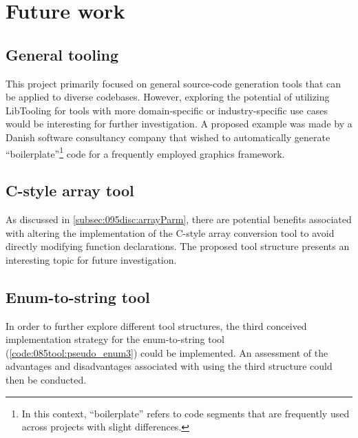 \section{Future work}

\subsection*{General tooling}
This project primarily focused on general source-code generation tools that can be applied to diverse codebases.
However, exploring the potential of utilizing LibTooling for tools with more domain-specific or industry-specific use cases would be interesting for further investigation.
A proposed example was made by a Danish software consultancy company that wished to automatically generate ``boilerplate''\footnote{
    In this context, ``boilerplate'' refers to code segments that are frequently used across projects with slight differences.
} code for a frequently employed graphics framework.


\subsection*{C-style array tool}
As discussed in \cref{subsec:095disc:arrayParm}, there are potential benefits associated with altering the implementation of the C-style array conversion tool to avoid directly modifying function declarations.
The proposed tool structure presents an interesting topic for future investigation.

\subsection*{Enum-to-string tool}
In order to further explore different tool structures, the third conceived implementation strategy for the enum-to-string tool (\cref{code:085tool:pseudo_enum3}) could be implemented.
An assessment of the advantages and disadvantages associated with using the third structure could then be conducted.

